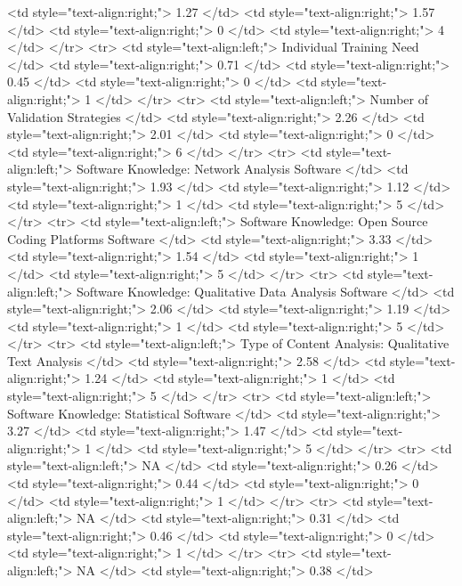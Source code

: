    <td style="text-align:right;"> 1.27 </td>
   <td style="text-align:right;"> 1.57 </td>
   <td style="text-align:right;"> 0 </td>
   <td style="text-align:right;"> 4 </td>
  </tr>
  <tr>
   <td style="text-align:left;"> Individual Training Need </td>
   <td style="text-align:right;"> 0.71 </td>
   <td style="text-align:right;"> 0.45 </td>
   <td style="text-align:right;"> 0 </td>
   <td style="text-align:right;"> 1 </td>
  </tr>
  <tr>
   <td style="text-align:left;"> Number of Validation Strategies </td>
   <td style="text-align:right;"> 2.26 </td>
   <td style="text-align:right;"> 2.01 </td>
   <td style="text-align:right;"> 0 </td>
   <td style="text-align:right;"> 6 </td>
  </tr>
  <tr>
   <td style="text-align:left;"> Software Knowledge: Network Analysis Software </td>
   <td style="text-align:right;"> 1.93 </td>
   <td style="text-align:right;"> 1.12 </td>
   <td style="text-align:right;"> 1 </td>
   <td style="text-align:right;"> 5 </td>
  </tr>
  <tr>
   <td style="text-align:left;"> Software Knowledge: Open Source Coding Platforms Software </td>
   <td style="text-align:right;"> 3.33 </td>
   <td style="text-align:right;"> 1.54 </td>
   <td style="text-align:right;"> 1 </td>
   <td style="text-align:right;"> 5 </td>
  </tr>
  <tr>
   <td style="text-align:left;"> Software Knowledge: Qualitative Data Analysis Software </td>
   <td style="text-align:right;"> 2.06 </td>
   <td style="text-align:right;"> 1.19 </td>
   <td style="text-align:right;"> 1 </td>
   <td style="text-align:right;"> 5 </td>
  </tr>
  <tr>
   <td style="text-align:left;"> Type of Content Analysis: Qualitative Text Analysis </td>
   <td style="text-align:right;"> 2.58 </td>
   <td style="text-align:right;"> 1.24 </td>
   <td style="text-align:right;"> 1 </td>
   <td style="text-align:right;"> 5 </td>
  </tr>
  <tr>
   <td style="text-align:left;"> Software Knowledge: Statistical Software </td>
   <td style="text-align:right;"> 3.27 </td>
   <td style="text-align:right;"> 1.47 </td>
   <td style="text-align:right;"> 1 </td>
   <td style="text-align:right;"> 5 </td>
  </tr>
  <tr>
   <td style="text-align:left;"> NA </td>
   <td style="text-align:right;"> 0.26 </td>
   <td style="text-align:right;"> 0.44 </td>
   <td style="text-align:right;"> 0 </td>
   <td style="text-align:right;"> 1 </td>
  </tr>
  <tr>
   <td style="text-align:left;"> NA </td>
   <td style="text-align:right;"> 0.31 </td>
   <td style="text-align:right;"> 0.46 </td>
   <td style="text-align:right;"> 0 </td>
   <td style="text-align:right;"> 1 </td>
  </tr>
  <tr>
   <td style="text-align:left;"> NA </td>
   <td style="text-align:right;"> 0.38 </td>
